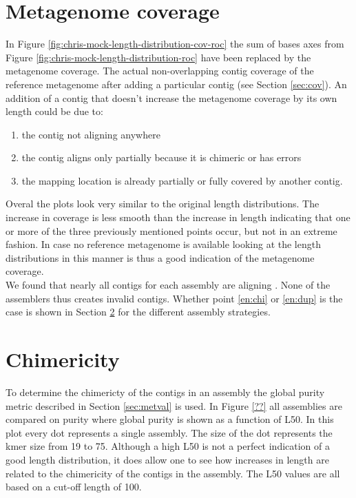 \documentclass[a4paper,12pt]{report}
\begin{document}
\section{Metagenome coverage}
In Figure \ref{fig:chris-mock-length-distribution-cov-roc} the sum of bases
axes from Figure \ref{fig:chris-mock-length-distribution-roc} have been
replaced by the metagenome coverage. The actual non-overlapping contig coverage
of the reference metagenome after adding a particular contig (see Section
\ref{sec:cov}).  An addition of a contig that doesn't increase the metagenome
coverage by its own length could be due to:
\begin{enumerate}
\item\label{en:aln} the contig not aligning anywhere
\item\label{en:chi} the contig aligns only partially because it is chimeric or has errors
\item\label{en:dup} the mapping location is already partially or fully covered by another
contig.
\end{enumerate}
Overal the plots look very similar to the original length distributions.  The
increase in coverage is less smooth than the increase in length indicating that
one or more of the three previously mentioned points occur, but not in an
extreme fashion. In case no reference metagenome is available looking at the
length distributions in this manner is thus a good indication of the metagenome
coverage.\\


We found that nearly all contigs for each assembly are aligning \cite{table??}.
None of the assemblers thus creates invalid contigs. Whether point \ref{en:chi}
or \ref{en:dup} is the case is shown in Section \ref{sec:reschi} for the
different assembly strategies.




\section{Chimericity}
\label{sec:reschi}
To determine the chimericty of the contigs in an assembly the global purity
metric described in Section \ref{sec:metval} is used. In Figure \ref{??} 
all assemblies are compared on purity where global purity is shown as a
function of L50. In this plot every dot represents a single assembly. The size
of the dot represents the kmer size from 19 to 75. Although a high L50 is not a
perfect indication of a good length distribution, it does allow one to see how
increases in length are related to the chimericity of the contigs in the
assembly. The L50 values are all based on a cut-off length of 100.\\
\end{document}

